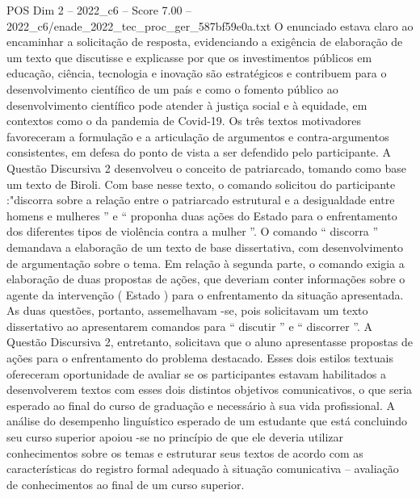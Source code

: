 \begin{textsample}{POS Dim 2 – 2022\_c6 – Score 7.00 – 2022\_c6/enade\_2022\_tec\_proc\_ger\_587bf59e0a.txt}
O enunciado estava claro ao encaminhar a solicitação de resposta, evidenciando a exigência de elaboração de um texto que discutisse e explicasse por que os investimentos públicos em educação, ciência, tecnologia e inovação são estratégicos e contribuem para o desenvolvimento científico de um país e como o fomento público ao desenvolvimento científico pode atender à justiça social e à equidade, em contextos como o da pandemia de Covid-19.
Os três textos motivadores favoreceram a formulação e a articulação de argumentos e contra-argumentos consistentes, em defesa do ponto de vista a ser defendido pelo participante.
A Questão Discursiva 2 desenvolveu o conceito de patriarcado, tomando como base um texto de Biroli.
Com base nesse texto, o comando solicitou do participante :"discorra sobre a relação entre o patriarcado estrutural e a desigualdade entre homens e mulheres ” e “ proponha duas ações do Estado para o enfrentamento dos diferentes tipos de violência contra a mulher ”.
O comando “ discorra ” demandava a elaboração de um texto de base dissertativa, com desenvolvimento de argumentação sobre o tema.
Em relação à segunda parte, o comando exigia a elaboração de duas propostas de ações, que deveriam conter informações sobre o agente da intervenção ( Estado ) para o enfrentamento da situação apresentada.
As duas questões, portanto, assemelhavam -se, pois solicitavam um texto dissertativo ao apresentarem comandos para “ discutir ” e “ discorrer ”.
A Questão Discursiva 2, entretanto, solicitava que o aluno apresentasse propostas de ações para o enfrentamento do problema destacado.
Esses dois estilos textuais ofereceram oportunidade de avaliar se os participantes estavam habilitados a desenvolverem textos com esses dois distintos objetivos comunicativos, o que seria esperado ao final do curso de graduação e necessário à sua vida profissional.
A análise do desempenho linguístico esperado de um estudante que está concluindo seu curso superior apoiou -se no princípio de que ele deveria utilizar conhecimentos sobre os temas e estruturar seus textos de acordo com as características do registro formal adequado à situação comunicativa – avaliação de conhecimentos ao final de um curso superior.

\end{textsample}
